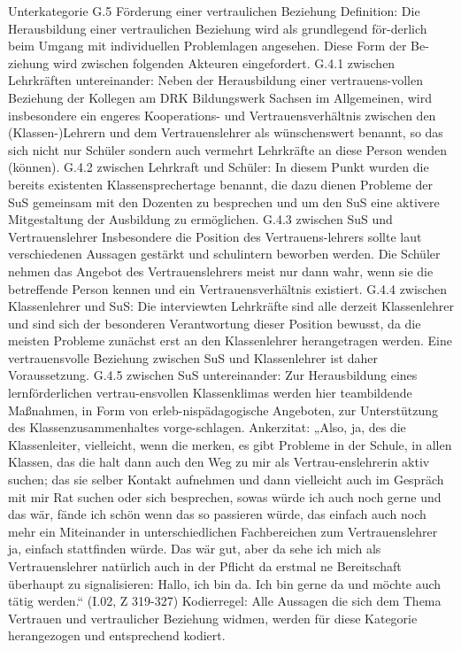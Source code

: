 Unterkategorie G.5 Förderung einer vertraulichen Beziehung
Definition: Die Herausbildung einer vertraulichen Beziehung wird als grundlegend för-derlich beim Umgang mit individuellen Problemlagen angesehen. Diese Form der Be-ziehung wird zwischen folgenden Akteuren eingefordert.
G.4.1 zwischen Lehrkräften untereinander: Neben der Herausbildung einer vertrauens-vollen Beziehung der Kollegen am DRK Bildungswerk Sachsen im Allgemeinen, wird insbesondere ein engeres Kooperations- und Vertrauensverhältnis zwischen den (Klassen-)Lehrern und dem Vertrauenslehrer als wünschenswert benannt, so das sich nicht nur Schüler sondern auch vermehrt Lehrkräfte an diese Person wenden (können).
G.4.2 zwischen Lehrkraft und Schüler: In diesem Punkt wurden die bereits existenten Klassensprechertage benannt, die dazu dienen Probleme der SuS gemeinsam mit den Dozenten zu besprechen und um den SuS eine aktivere Mitgestaltung der Ausbildung zu ermöglichen.
G.4.3 zwischen SuS und Vertrauenslehrer Insbesondere die Position des Vertrauens-lehrers sollte laut verschiedenen Aussagen gestärkt und schulintern beworben werden. Die Schüler nehmen das Angebot des Vertrauenslehrers meist nur dann wahr, wenn sie die betreffende Person kennen und ein Vertrauensverhältnis existiert.
G.4.4 zwischen Klassenlehrer und SuS: Die interviewten Lehrkräfte sind alle derzeit Klassenlehrer und sind sich der besonderen Verantwortung dieser Position bewusst, da die meisten Probleme zunächst erst an den Klassenlehrer herangetragen werden. Eine vertrauensvolle Beziehung zwischen SuS und Klassenlehrer ist daher Voraussetzung.
G.4.5 zwischen SuS untereinander: Zur Herausbildung eines lernförderlichen vertrau-ensvollen Klassenklimas werden hier teambildende Maßnahmen, in Form von erleb-nispädagogische Angeboten, zur Unterstützung des Klassenzusammenhaltes vorge-schlagen. 
Ankerzitat: „Also, ja, des die Klassenleiter, vielleicht, wenn die merken, es gibt Probleme in der Schule, in allen Klassen, das die halt dann auch den Weg zu mir als Vertrau-enslehrerin aktiv suchen; das sie selber Kontakt aufnehmen und dann vielleicht auch im Gespräch mit mir Rat suchen oder sich besprechen, sowas würde ich auch noch gerne und das wär, fände ich schön wenn das so passieren würde, das einfach auch noch mehr ein Miteinander in unterschiedlichen Fachbereichen zum Vertrauenslehrer ja, einfach stattfinden würde. Das wär gut, aber da sehe ich mich als Vertrauenslehrer natürlich auch in der Pflicht da erstmal ne Bereitschaft überhaupt zu signalisieren: Hallo, ich bin da. Ich bin gerne da und möchte auch tätig werden.“ (I.02, Z 319-327)
Kodierregel: Alle Aussagen die sich dem Thema Vertrauen und vertraulicher Beziehung widmen, werden für diese Kategorie herangezogen und entsprechend kodiert.


